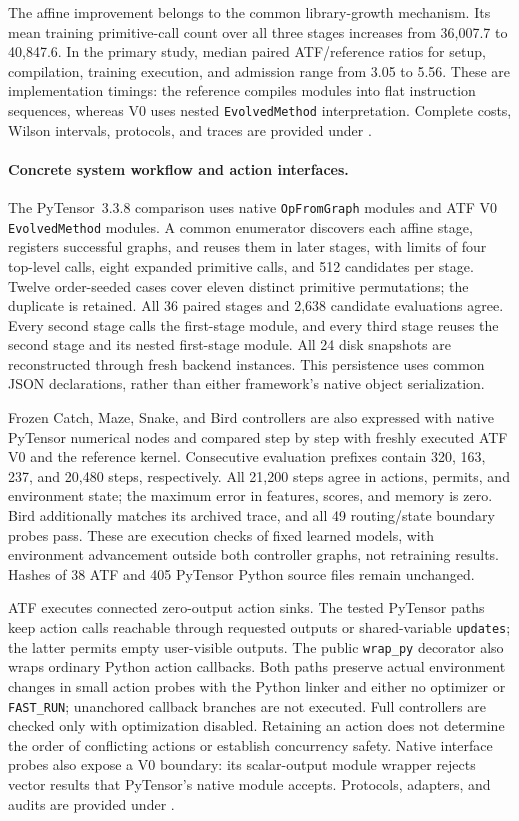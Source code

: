 The affine improvement belongs to the common library-growth mechanism.
Its mean training primitive-call count over all three stages increases from
36,007.7 to 40,847.6. In the primary study, median paired ATF/reference ratios
for setup, compilation, training execution, and admission range from 3.05 to
5.56. These are implementation timings: the reference compiles modules into
flat instruction sequences, whereas V0 uses nested \texttt{EvolvedMethod}
interpretation. Complete costs, Wilson intervals, protocols, and traces are
provided under .

\paragraph{Concrete system workflow and action interfaces.}
The PyTensor~3.3.8 comparison uses native \texttt{OpFromGraph} modules and ATF
V0 \texttt{EvolvedMethod} modules. A common enumerator discovers each affine
stage, registers successful graphs, and reuses them in later stages, with limits
of four top-level calls, eight expanded primitive calls, and 512 candidates per
stage. Twelve order-seeded cases cover eleven distinct primitive permutations;
the duplicate is retained. All 36 paired stages and 2,638 candidate evaluations
agree. Every second stage calls the first-stage module, and every third stage
reuses the second stage and its nested first-stage module. All 24 disk snapshots
are reconstructed through fresh backend instances. This persistence uses common
JSON declarations, rather than either framework's native object serialization.

Frozen Catch, Maze, Snake, and Bird controllers are also expressed with native
PyTensor numerical nodes and compared step by step with freshly executed ATF
V0 and the reference kernel. Consecutive evaluation prefixes contain 320, 163,
237, and 20,480 steps, respectively. All 21,200 steps agree in actions, permits,
and environment state; the maximum error in features, scores, and memory is
zero. Bird additionally matches its archived trace, and all 49 routing/state
boundary probes pass. These are execution checks of fixed learned models, with
environment advancement outside both controller graphs, not retraining results.
Hashes of 38 ATF and 405 PyTensor Python source files remain unchanged.

ATF executes connected zero-output action sinks. The tested PyTensor paths keep
action calls reachable through requested outputs or shared-variable
\texttt{updates}; the latter permits empty user-visible outputs. The public
\texttt{wrap\_py} decorator also wraps ordinary Python action callbacks.
Both paths preserve actual environment changes in small action probes with
the Python linker and either no optimizer or \texttt{FAST\_RUN}; unanchored
callback branches are not executed. Full controllers are checked only with
optimization disabled. Retaining an action does not determine the order of
conflicting actions or establish concurrency safety. Native interface probes
also expose a V0 boundary: its scalar-output module wrapper rejects vector
results that PyTensor's native module accepts. Protocols, adapters, and audits
are provided under .
